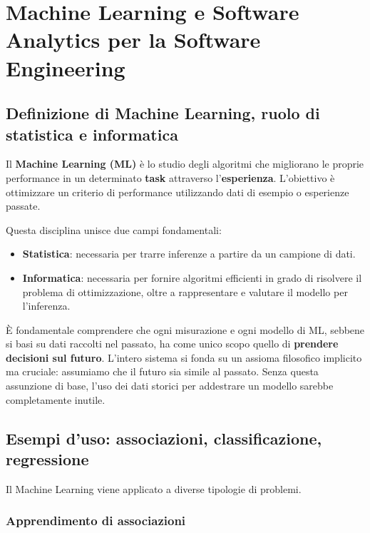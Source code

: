 \chapter{Machine Learning e Software Analytics per la Software Engineering}

\section{Definizione di Machine Learning, ruolo di statistica e informatica}

Il \textbf{Machine Learning (ML)} è lo studio degli algoritmi che migliorano le proprie performance in un determinato \textbf{task} attraverso l'\textbf{esperienza}. L'obiettivo è ottimizzare un criterio di performance utilizzando dati di esempio o esperienze passate.

Questa disciplina unisce due campi fondamentali:
\begin{itemize}
    \item \textbf{Statistica}: necessaria per trarre inferenze a partire da un campione di dati.
    \item \textbf{Informatica}: necessaria per fornire algoritmi efficienti in grado di risolvere il problema di ottimizzazione, oltre a rappresentare e valutare il modello per l'inferenza.
\end{itemize}

\begin{notaprof}
È fondamentale comprendere che ogni misurazione e ogni modello di ML, sebbene si basi su dati raccolti nel passato, ha come unico scopo quello di \textbf{prendere decisioni sul futuro}. L'intero sistema si fonda su un assioma filosofico implicito ma cruciale: assumiamo che il futuro sia simile al passato. Senza questa assunzione di base, l'uso dei dati storici per addestrare un modello sarebbe completamente inutile.
\end{notaprof}

\section{Esempi d'uso: associazioni, classificazione, regressione}

Il Machine Learning viene applicato a diverse tipologie di problemi.

\subsection{Apprendimento di associazioni}

